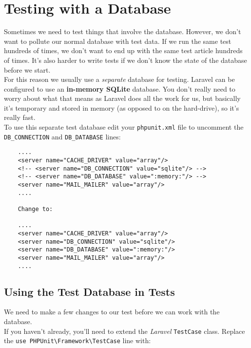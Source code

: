 

\section{Testing with a Database}

Sometimes we need to test things that involve the database. However, we don't want to pollute our normal database with test data. If we run the same test hundreds of times, we don't want to end up with the same test article hundreds of times. It's also harder to write tests if we don't know the state of the database before we start.
\\

For this reason we usually use a \textit{separate} database for testing. Laravel can be configured to use an \textbf{in-memory SQLite} database. You don't really need to worry about what that means as Laravel does all the work for us, but basically it's temporary and stored in memory (as opposed to on the hard-drive), so it's really fast.
\\

To use this separate test database edit your \texttt{phpunit.xml} file to uncomment the \texttt{DB\_CONNECTION} and \texttt{DB\_DATABASE} lines:

\begin{verbatim}
    ....
    <server name="CACHE_DRIVER" value="array"/>
    <!-- <server name="DB_CONNECTION" value="sqlite"/> -->
    <!-- <server name="DB_DATABASE" value=":memory:"/> -->
    <server name="MAIL_MAILER" value="array"/>
    ....

    Change to:

    ....
    <server name="CACHE_DRIVER" value="array"/>
    <server name="DB_CONNECTION" value="sqlite"/>
    <server name="DB_DATABASE" value=":memory:"/>
    <server name="MAIL_MAILER" value="array"/>
    ....
\end{verbatim}

\subsection{Using the Test Database in Tests}

We need to make a few changes to our test before we can work with the database.
\\

If you haven't already, you'll need to extend the \textit{Laravel} \texttt{TestCase} class. Replace the \texttt{use PHPUnit\textbackslash{}Framework\textbackslash{}TestCase} line with:

